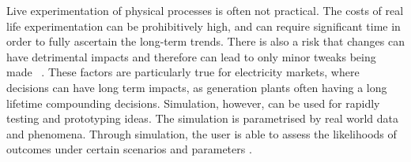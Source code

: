 

Live experimentation of physical processes is often not practical. The costs of real life experimentation can be prohibitively high, and can require significant time in order to fully ascertain the long-term trends. There is also a risk that changes can have detrimental impacts and therefore can lead to only minor tweaks being made ~\cite{Forshaw2016}. These factors are particularly true for electricity markets, where decisions can have long term impacts, as generation plants often having a long lifetime compounding decisions. Simulation, however, can be used for rapidly testing and prototyping ideas. The simulation is parametrised by real world data and phenomena. Through simulation, the user is able to assess the likelihoods of outcomes under certain scenarios and parameters \cite{Law:603360}.



